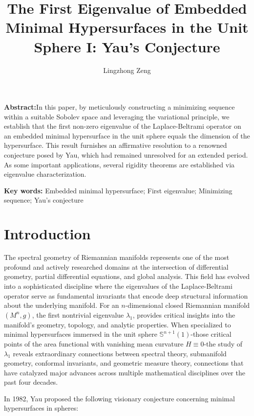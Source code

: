 \documentclass[a4, 12pt]{amsart}
\title[The First Eigenvalue]{The First Eigenvalue of Embedded Minimal Hypersurfaces in the Unit Sphere I: Yau's Conjecture}
\author[L. Zeng]{Lingzhong Zeng}
\numberwithin{equation}{section} \numberwithin{equation}{section}
\begin{document}
\maketitle

\textbf{Abstract:}In this paper, by meticulously constructing a minimizing sequence within a suitable Sobolev space and leveraging the variational principle, we establish that the first non-zero eigenvalue of the Laplace-Beltrami operator on an embedded minimal hypersurface in the unit sphere equals the dimension of the hypersurface. This result furnishes an affirmative resolution to a renowned conjecture posed by Yau, which had remained unresolved for an extended period. As some important applications, several rigidity theorems are established via eigenvalue characterization.

\textbf{Key words:} Embedded minimal hypersurface; First eigenvalue;  Minimizing sequence; Yau's conjecture

\section{Introduction}

The spectral geometry of Riemannian manifolds represents one of the most profound and actively researched domains at the intersection of differential geometry, partial differential equations, and global analysis. This field has evolved into a sophisticated discipline where the eigenvalues of the Laplace-Beltrami operator serve as fundamental invariants that encode deep structural information about the underlying manifold.   For an $n$-dimensional closed Riemannian manifold $(M^n, g)$, the first nontrivial eigenvalue $\lambda_1$, provides critical insights into the manifold's geometry, topology, and analytic properties. When specialized to minimal hypersurfaces immersed in the unit sphere $\mathbb{S}^{n+1}(1)$-those critical points of the area functional with vanishing mean curvature $H \equiv 0$-the study of $\lambda_1$ reveals extraordinary connections between spectral theory, submanifold geometry, conformal invariants, and geometric measure theory, connections that have catalyzed major advances across multiple mathematical disciplines over the past four decades.

In 1982, Yau proposed the following visionary conjecture concerning minimal hypersurfaces in spheres:
\end{document}

